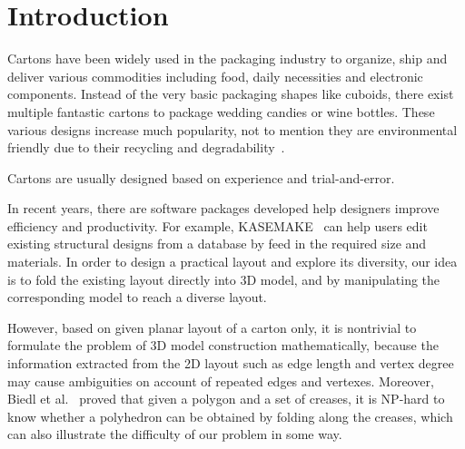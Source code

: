 \section{Introduction}

Cartons have been widely used in the packaging industry to organize, ship and deliver various commodities including food, daily necessities and electronic components. Instead of the very basic packaging shapes like cuboids, there exist multiple fantastic cartons to package wedding candies or wine bottles. 
These various designs increase much popularity, not to mention they are environmental friendly due to their recycling and degradability~\cite{Mullineux:2010:CSC:1739328.1739673}.

Cartons are usually designed based on experience and trial-and-error.
{\color{red}{Designers often start package design by generating 2D vector artwork, then a 3D mockup is essential to be made for designers and clients to see the real appearance. There are two ways to create a 3D mockup, a digital mockup is a great way of showing how the design would appear with lower cost, and a practical mockup can be helpful when making sure the size is correct and making final decision.}}

In recent years, there are software packages developed help designers improve efficiency and productivity.
For example, KASEMAKE~\cite{KASEMAKE} can help users edit existing structural designs from a database by feed in the required size and materials.
{\color{red}{However, the existing softwares can not generate 3D model from 2D layout with little time and effort.}}
In order to design a practical layout and explore its diversity, our idea is to fold the existing layout directly into 3D model, and by manipulating the corresponding model to reach a diverse layout.

However, based on given planar layout of a carton only, it is nontrivial to formulate the problem of 3D model construction mathematically, because the information extracted from the 2D layout such as edge length and vertex degree may cause ambiguities on account of repeated edges and vertexes. Moreover, Biedl et al.~\cite{Biedl:2005:NFP:1090462.1646553} proved that given a polygon and a set of creases, it is NP-hard to know whether a polyhedron can be obtained by folding along the creases, which can also illustrate the difficulty of our problem in some way.

